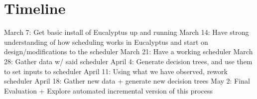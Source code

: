 \section{Timeline}
March 7: Get basic install of Eucalyptus up and running
March 14: Have strong understanding of how scheduling works in Eucalyptus and start on design/modifications to the scheduler
March 21: Have a working scheduler
March 28: Gather data w/ said scheduler
April 4: Generate decision trees, and use them to set inputs to scheduler
April 11: Using what we have observed, rework scheduler
April 18: Gather new data + generate new decision trees
May 2: Final Evaluation + Explore automated incremental version of this process
